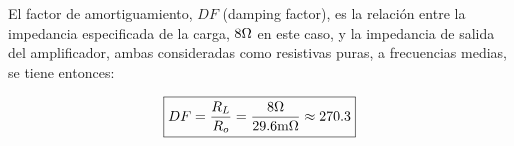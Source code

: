 \vspace{1.5cm}

El factor de amortiguamiento, $DF$ (damping factor), es la relación entre la impedancia especificada de la carga, $8 \si[per-mode=symbol]{\ohm}$ en este caso, y la impedancia de salida del amplificador, ambas consideradas como resistivas puras, a frecuencias medias, se tiene entonces:


\begin{equation}
\boxed{ DF = \frac{R_{L}}{R_{o}} = \frac{8 \si[per-mode=symbol]{\ohm}}{29.6 \si[per-mode=symbol]{\milli\ohm}} \approx 270.3 }
\end{equation}


\vfill

\clearpage

